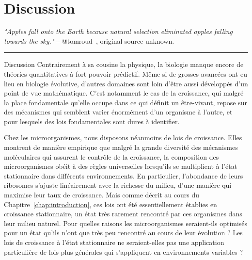 \chapter{Discussion}
\label{chap:discussion}

\textit{"Apples fall onto the Earth because natural selection eliminated apples falling towards the sky."} -- @tomroud~\cite{tomroud_tom_2016}, original source unknown.


\begin{center}
\noindent\rule{4cm}{0.1pt}
\end{center}

\begin{chapter_summary}{Discussion}
Contrairement à sa cousine la physique, la biologie manque encore de théories quantitatives à fort pouvoir prédictif.
Même si de grosses avancées ont eu lieu en biologie évolutive, d'autres domaines sont loin d'être aussi développés d'un point de vue mathématique.
C'est notamment le cas de la croissance, qui malgré la place fondamentale qu'elle occupe dans ce qui définit un être-vivant, repose sur des mécanismes qui semblent varier énormément d'un organisme à l'autre, et pour lesquels des lois fondamentales sont dures à identifier.

Chez les microorganismes, nous disposons néanmoins de lois de croissance.
Elles montrent de manière empirique que malgré la grande diversité des mécanismes moléculaires qui assurent le contrôle de la croissance, la composition des microorganismes obéit à des règles universelles lorsqu'ils se multiplient à l'état stationnaire dans différents environnements.
En particulier, l'abondance de leurs ribosomes s'ajuste linéairement avec la richesse du milieu, d'une manière qui maximise leur taux de croissance.
Mais comme décrit au cours du Chapitre~\ref{chap:introduction}, ces lois ont été essentiellement établies en croissance stationnaire, un état très rarement rencontré par ces organismes dans leur milieu naturel.
Pour quelles raisons les microorganismes seraient-ils optimisés pour un état qu'ils n'ont que très peu rencontré au cours de leur évolution ?
Les lois de croissance à l'état stationnaire ne seraient-elles pas une application particulière de lois plus générales qui s'appliquent en environnements variables ?


\end{chapter_summary}
